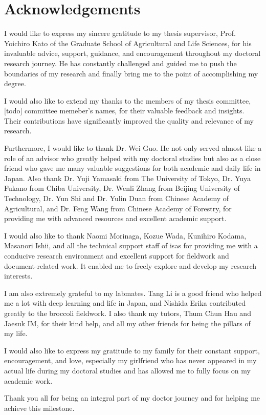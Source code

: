 \chapter*{Acknowledgements}

I would like to express my sincere gratitude to my thesis supervisor, Prof. Yoichiro Kato of the Graduate School of Agricultural and Life Sciences, for his invaluable advice, support, guidance, and encouragement throughout my doctoral research journey. He has constantly challenged and guided me to push the boundaries of my research and finally bring me to the point of accomplishing my degree.

I would also like to extend my thanks to the members of my thesis committee, [todo] committee memeber's names, for their valuable feedback and insights. Their contributions have significantly improved the quality and relevance of my research.

Furthermore, I would like to thank Dr. Wei Guo. He not only served almost like a role of an advisor who greatly helped with my doctoral studies but also as a close friend who gave me many valuable suggestions for both academic and daily life in Japan. Also thank Dr. Yuji Yamasaki from The University of Tokyo, Dr. Yuya Fukano from Chiba University, Dr. Wenli Zhang from Beijing University of Technology, Dr. Yun Shi and Dr. Yulin Duan from Chinese Academy of Agricultural, and Dr. Feng Wang from Chinese Academy of Forestry, for providing me with advanced resources and excellent academic support.

I would also like to thank Naomi Morinaga, Kozue Wada, Kunihiro Kodama, Masanori Ishii, and all the technical support staff of \gls{isas} for providing me with a conducive research environment and excellent support for fieldwork and document-related work. It enabled me to freely explore and develop my research interests.

I am also extremely grateful to my labmates. Tang Li is a good friend who helped me a lot with deep learning and life in Japan, and Nishida Erika contributed greatly to the broccoli fieldwork. I also thank my tutors, Thum Chun Hau and Jaesuk IM, for their kind help, and all my other friends for being the pillars of my life.

I would also like to express my gratitude to my family for their constant support, encouragement, and love, especially my girlfriend who has never appeared in my actual life during my doctoral studies and has allowed me to fully focus on my academic work.

Thank you all for being an integral part of my doctor journey and for helping me achieve this milestone.